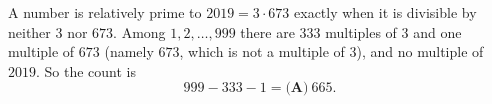 A number is relatively prime to $2019=3\cdot673$ exactly when it is divisible by neither $3$ nor $673$. Among $1,2,\dots,999$ there are $333$ multiples of $3$ and one multiple of $673$ (namely $673$, which is not a multiple of $3$), and no multiple of $2019$. So the count is
\[
999-333-1=\boxed{\textbf{(A)}\ 665}.
\]
